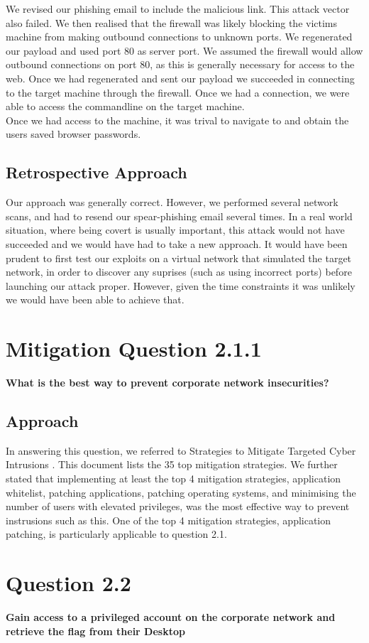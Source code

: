 We revised our phishing email to include the malicious link. This attack vector also failed. We then realised that the firewall was likely blocking the victims machine from making outbound connections to unknown ports. We regenerated our payload and used port 80 as server port. We assumed the firewall would allow outbound connections on port 80, as this is generally necessary for access to the web. Once we had regenerated and sent our payload we succeeded in connecting to the target machine through the firewall. Once we had a connection, we were able to access the commandline on the target machine.\\
Once we had access to the machine, it was trival to navigate to and obtain the users saved browser passwords.
\subsection{Retrospective Approach}
Our approach was generally correct. However, we performed several network scans, and had to resend our spear-phishing email several times. In a real world situation, where being covert is usually important, this attack would not have succeeded and we would have had to take a new approach. It would have been prudent to first test our exploits on a virtual network that simulated the target network, in order to discover any suprises (such as using incorrect ports) before launching our attack proper. However, given the time constraints it was unlikely we would have been able to achieve that. 
\section{Mitigation Question 2.1.1}
\textbf{What is the best way to prevent corporate network insecurities?}
\subsection{Approach}
In answering this question, we referred to Strategies to Mitigate Targeted Cyber Intrusions \cite{dsd}. This document lists the 35 top mitigation strategies. We further stated that implementing at least the top 4 mitigation strategies, application whitelist, patching applications, patching operating systems, and minimising the number of users with elevated privileges, was the most effective way to prevent instrusions such as this. One of the top 4 mitigation strategies, application patching, is particularly applicable to question 2.1. 
\section{Question 2.2}
\textbf{Gain access to a privileged account on the corporate network and
retrieve the flag from their Desktop}

